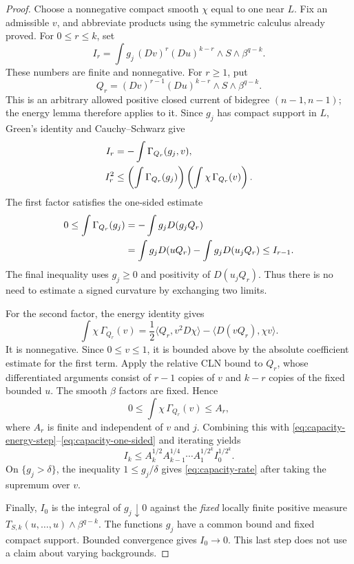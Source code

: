 \documentclass[11pt,a4paper]{article}
\numberwithin{equation}{section}
\theoremstyle{definition}
\theoremstyle{remark}
\begin{document}
\begin{proof}
Choose a nonnegative compact smooth $\chi$ equal to one near $L$.
Fix an admissible $v$, and abbreviate products using the symmetric
calculus already proved. For $0\leq r\leq k$, set
\[
 I_r=\int g_j\,(Dv)^r(Du)^{k-r}\wedge S\wedge\beta^{q-k}.
\]
These numbers are finite and nonnegative. For $r\geq1$, put
\[
 Q_r=(Dv)^{r-1}(Du)^{k-r}\wedge S\wedge\beta^{q-k}.
\]
This is an arbitrary allowed positive closed current of bidegree
$(n-1,n-1)$; the energy lemma therefore applies to it. Since $g_j$
has compact support in $L$, Green's identity and Cauchy--Schwarz give
\begin{align}
 I_r
  &= -\int\Gamma_{Q_r}(g_j,v),\notag\\
 I_r^2
  &\leq\left(\int\Gamma_{Q_r}(g_j)\right)
          \left(\int\chi\,\Gamma_{Q_r}(v)\right). 
 \label{eq:capacity-energy-step}
\end{align}
The first factor satisfies the one-sided estimate
\begin{align}
 0\leq\int\Gamma_{Q_r}(g_j)
  &= -\int g_jD(g_jQ_r)\notag\\
  &=\int g_jD(uQ_r)-\int g_jD(u_jQ_r)
    \leq I_{r-1}.
 \label{eq:capacity-one-sided}
\end{align}
The final inequality uses $g_j\geq0$ and positivity of
$D(u_jQ_r)$. Thus there is no need to estimate a signed curvature
by exchanging two limits.

For the second factor, the energy identity gives
\[
 \int\chi\,\Gamma_{Q_r}(v)
   =\frac12\langle Q_r,v^2D\chi\rangle
                         -\langle D(vQ_r),\chi v\rangle.
\]
It is nonnegative. Since $0\leq v\leq1$, it is bounded above by
the absolute coefficient estimate for the first term. Apply the
relative CLN bound to $Q_r$, whose differentiated arguments consist
of $r-1$ copies of $v$ and $k-r$ copies of the fixed bounded $u$.
The smooth $\beta$ factors are fixed. Hence
\[
 0\leq\int\chi\,\Gamma_{Q_r}(v)\leq A_r,
\]
where $A_r$ is finite and independent of $v$ and $j$. Combining this
with \eqref{eq:capacity-energy-step}--\eqref{eq:capacity-one-sided}
and iterating yields
\[
 I_k\leq
 A_k^{1/2}A_{k-1}^{1/4}\cdots A_1^{1/2^k}I_0^{1/2^k}.
\]
On $\{g_j>\delta\}$, the inequality
$1\leq g_j/\delta$ gives \eqref{eq:capacity-rate} after taking the
supremum over $v$.

Finally, $I_0$ is the integral of $g_j\downarrow0$ against the
\emph{fixed} locally finite positive measure
$T_{S,k}(u,\ldots,u)\wedge\beta^{q-k}$. The functions
$g_j$ have a common bound and fixed compact support. Bounded
convergence gives $I_0\to0$. This last step does not use a claim about
varying backgrounds.
\end{proof}
\end{document}
